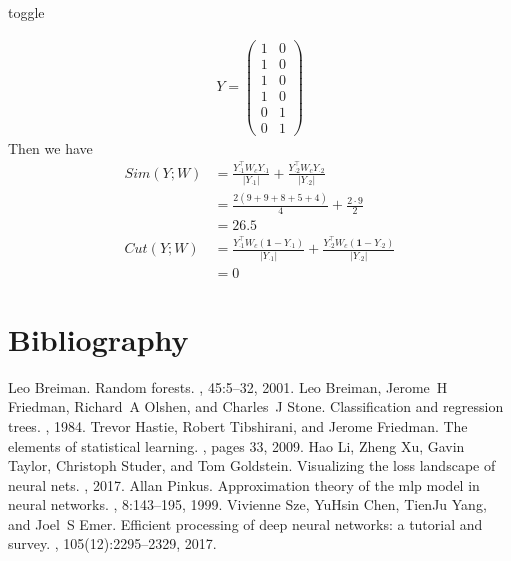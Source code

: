 \documentclass[letterpaper,10pt,english]{jupyterBook}
\begin{document}
\begin{sphinxuseclass}{toggle}
\begin{enumerate}
\end{enumerate}
\begin{align*}Y=
\begin{pmatrix}
1 & 0\\
1 & 0\\
1 & 0\\
1 & 0\\
0 & 1\\
0 & 1
\end{pmatrix}\end{align*}
\sphinxAtStartPar
Then we have
\begin{align*}
    Sim(Y;W) & = \frac{Y_{\cdot 1}^\top W_c Y_{\cdot 1}}{\lvert Y_{\cdot 1}\rvert} + \frac{Y_{\cdot 2}^\top W_c Y_{\cdot 2}}{\lvert Y_{\cdot 2}\rvert} \\
    &= \frac{2(9+9+8+5+4)}{4} + \frac{2\cdot 9}{2}\\
    &= 26.5\\
    Cut(Y;W) & = \frac{Y_{\cdot 1}^\top W_c (\mathbf{1} - Y_{\cdot 1})}{\lvert Y_{\cdot 1}\rvert} + \frac{Y_{\cdot 2}^\top W_c (\mathbf{1} - Y_{\cdot 2})}{\lvert Y_{\cdot 2}\rvert}\\
    &=0
\end{align*}
\end{sphinxuseclass}
\sphinxstepscope


\chapter{Bibliography}
\label{\detokenize{bibliography:bibliography}}\label{\detokenize{bibliography::doc}}
\begin{sphinxthebibliography}{1}
\sphinxAtStartPar
Leo Breiman. Random forests. , 45:5–32, 2001.
\sphinxAtStartPar
Leo Breiman, Jerome H Friedman, Richard A Olshen, and Charles J Stone. Classification and regression trees. , 1984.
\sphinxAtStartPar
Trevor Hastie, Robert Tibshirani, and Jerome Friedman. The elements of statistical learning. , pages 33, 2009.
\sphinxAtStartPar
Hao Li, Zheng Xu, Gavin Taylor, Christoph Studer, and Tom Goldstein. Visualizing the loss landscape of neural nets. , 2017.
\sphinxAtStartPar
Allan Pinkus. Approximation theory of the mlp model in neural networks. , 8:143–195, 1999.
\sphinxAtStartPar
{}
\sphinxAtStartPar
Vivienne Sze, Yu\sphinxhyphen{}Hsin Chen, Tien\sphinxhyphen{}Ju Yang, and Joel S Emer. Efficient processing of deep neural networks: a tutorial and survey. , 105(12):2295–2329, 2017.
\end{sphinxthebibliography}
\end{document}
